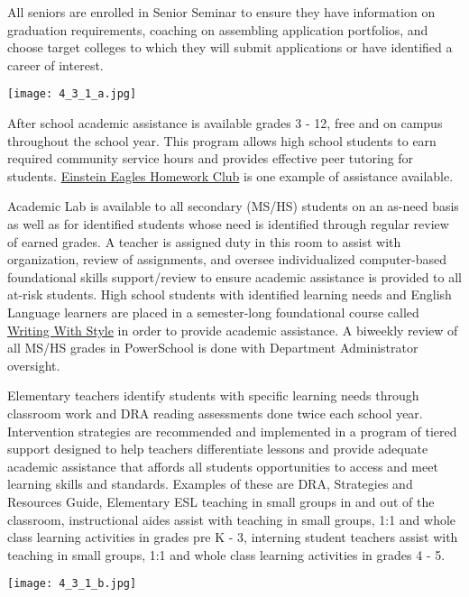 \begin{findings}
All seniors are enrolled in Senior Seminar to ensure they have information on graduation requirements, coaching on assembling application portfolios, and choose target colleges to which they will submit applications or have identified a career of interest.

{\centering\texttt{[image: 4\_3\_1\_a.jpg]}}

After school academic assistance is available grades 3 - 12, free and on campus throughout the school year. This program allows high school students to earn required community service hours and provides effective peer tutoring for students.  \href{http://blogs.cmis.ac.th/newsletter/2015/09/17/einstein-eagles-starts-monday-get-involved/}{Einstein Eagles Homework Club} is one example of assistance available.

Academic Lab is available to all secondary (MS/HS) students on an as-need basis as well as for identified students whose need is identified through regular review of earned grades. A teacher is assigned duty in this room to assist with organization, review of assignments, and oversee individualized computer-based foundational skills support/review to ensure academic assistance is provided to all at-risk students. High school students with identified learning needs and English Language learners are placed in a semester-long foundational course called \href{https://drive.google.com/open?id=100aj_4W2p7cnSRhdpkEhTtGRoBIBMe6Uy8JgKBVyofk}{Writing With Style} in order to provide academic assistance. A biweekly review of all MS/HS grades in PowerSchool is done with Department Administrator oversight.

Elementary teachers identify students with specific learning needs through classroom work and DRA reading assessments done twice each school year. Intervention strategies are recommended and implemented in a program of tiered support designed to help teachers differentiate lessons and provide adequate academic assistance that affords all students opportunities to access and meet learning skills and standards. Examples of these are DRA, Strategies and Resources Guide, Elementary ESL teaching in small groups in and out of the classroom, instructional aides assist with teaching in small groups, 1:1 and whole class learning activities in grades pre K - 3, interning student teachers assist with teaching in small groups, 1:1 and whole class learning activities in grades 4 - 5. 

{\centering\texttt{[image: 4\_3\_1\_b.jpg]}}


\end{findings}
